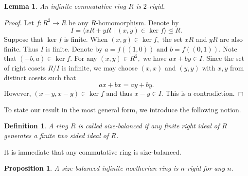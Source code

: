 \documentclass{gtpart}     %
\newtheorem{definition}[theorem]{Definition}
\newtheorem{lemma}[theorem]{Lemma}
\newtheorem{proposition}[theorem]{Proposition}
\begin{document}
\begin{lemma}
\label{comm}An infinite commutative ring $R$ is $2$-rigid.
\end{lemma}

\begin{proof}
Let $f:R^{2}\rightarrow R$ be any $R$-homomorphism. Denote by
\begin{equation*}
I=\langle xR+yR\mid (x,y)\in \ker f\rangle \unlhd R.
\end{equation*}%
Suppose that $\ker f$ is finite. When $(x,y)\in \ker f,$ the set $xR$ and $%
yR $ are also finite. Thus $I$ is finite. Denote by $a=f((1,0))$ and $%
b=f((0,1)).$ Note that $(-b,a)\in \ker f.$ For any $(x,y)\in R^{2},$ we have
$ax+by\in I.$ Since the set of right cosets $R/I$ is infinite, we may choose
$(x,x)$ and $(y,y)$ with $x,y$ from distinct cosets such that
\begin{equation*}
ax+bx=ay+by.
\end{equation*}%
However, $(x-y,x-y)\in \ker f$ and thus $x-y\in I.$ This is a contradiction.
\end{proof}

To state our result in the most general form, we introduce the following
notion.

\begin{definition}
A ring $R$ is called \emph{size-balanced} if any finite right ideal of $R$
generates a finite two sided ideal of $R$.
\end{definition}

It is immediate that any commutative ring is size-balanced.

\begin{proposition}
\label{prop-asin} A size-balanced infinite noetherian ring is $n$-rigid for
any $n.$
\end{proposition}
\end{document}
